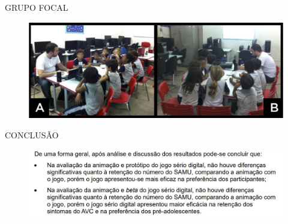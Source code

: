 \documentclass{Alexandre}
\begin{document}
\begin{frame}{GRUPO FOCAL}
    
    \begin{figure}
        \includegraphics[scale = 0.25]{Figuras/GrupoFocal.jpg}
    \end{figure}

\end{frame}


\begin{frame}{CONCLUSÃO}
    
    \begin{figure}
        \includegraphics[scale = 0.29]{Figuras/Conclusao.jpg}
    \end{figure}

\end{frame}
\end{document}
